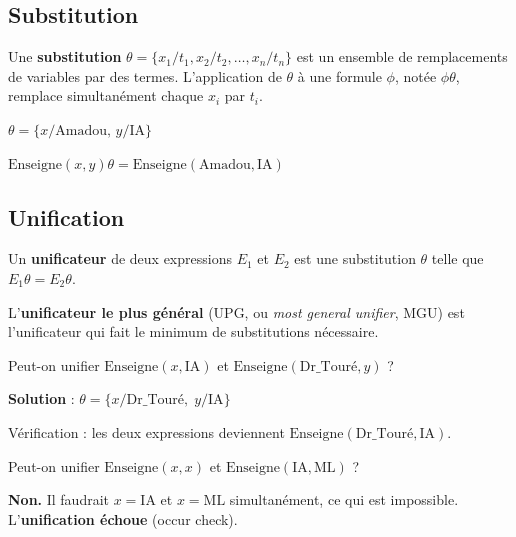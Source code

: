 \documentclass[11pt,a4paper]{article}
\newcommand{\cmark}{\ding{51}}
\begin{document}
\subsection{Substitution}

\begin{definitionbox}
Une \textbf{substitution} $\theta = \{x_1/t_1, x_2/t_2, \ldots, x_n/t_n\}$ est un ensemble de remplacements de variables par des termes. L'application de $\theta$ à une formule $\phi$, notée $\phi\theta$, remplace simultanément chaque $x_i$ par $t_i$.
\end{definitionbox}

\begin{exemplebox}
$\theta = \{x/\text{Amadou}, \, y/\text{IA}\}$

$\text{Enseigne}(x, y)\theta = \text{Enseigne}(\text{Amadou}, \text{IA})$
\end{exemplebox}

\subsection{Unification}

\begin{definitionbox}
Un \textbf{unificateur} de deux expressions $E_1$ et $E_2$ est une substitution $\theta$ telle que $E_1\theta = E_2\theta$.

L'\textbf{unificateur le plus général} (UPG, ou \textit{most general unifier}, MGU) est l'unificateur qui fait le minimum de substitutions nécessaire.
\end{definitionbox}

\begin{exemplebox}
Peut-on unifier $\text{Enseigne}(x, \text{IA})$ et $\text{Enseigne}(\text{Dr\_Touré}, y)$ ?

\textbf{Solution} : $\theta = \{x/\text{Dr\_Touré}, \; y/\text{IA}\}$

Vérification : les deux expressions deviennent $\text{Enseigne}(\text{Dr\_Touré}, \text{IA})$. \cmark

\medskip

Peut-on unifier $\text{Enseigne}(x, x)$ et $\text{Enseigne}(\text{IA}, \text{ML})$ ?

\textbf{Non.} Il faudrait $x = \text{IA}$ et $x = \text{ML}$ simultanément, ce qui est impossible. L'\textbf{unification échoue} (occur check).
\end{exemplebox}
\end{document}
